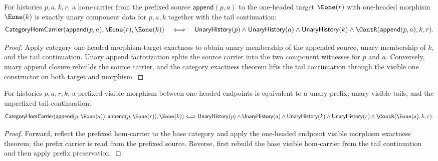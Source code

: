 \begin{theorem}
\label{thm:functor-prefix-hom-carrier-e1-morphism-target-components-iff}
For histories $p,a,k,r$, a hom-carrier from the prefixed source
$\mathsf{append}(p,a)$ to the one-headed target $\Eone(r)$ with one-headed
morphism $\Eone(k)$ is exactly unary component data for $p,a,k$ together with
the tail continuation:
$$
\mathsf{CategoryHomCarrier}(\mathsf{append}(p,a),\Eone(r),\Eone(k))
\quad\Longleftrightarrow\quad
\mathsf{UnaryHistory}(p)\land\mathsf{UnaryHistory}(a)\land
\mathsf{UnaryHistory}(k)\land\ContR(\mathsf{append}(p,a),k,r).
$$
\end{theorem}
\begin{proof}
Apply category one-headed morphism-target exactness to obtain unary membership
of the appended source, unary membership of $k$, and the tail continuation.
Unary append factorization splits the source carrier into the two component
witnesses for $p$ and $a$. Conversely, unary append closure rebuilds the source
carrier, and the category exactness theorem lifts the tail continuation through
the visible one constructor on both target and morphism.
\end{proof}
\begin{theorem}
\label{thm:functor-prefix-hom-carrier-e1-endpoint-visible-morphism-iff}
For histories $p,a,r,k$, a prefixed visible morphism between one-headed
endpoints is equivalent to a unary prefix, unary visible tails, and the
unprefixed tail continuation:
$$
\mathsf{CategoryHomCarrier}(\mathsf{append}(p,\Eone(a)),
\mathsf{append}(p,\Eone(r)),\Eone(k))
\Longleftrightarrow
\mathsf{UnaryHistory}(p)\wedge\mathsf{UnaryHistory}(a)\wedge
\mathsf{UnaryHistory}(k)\wedge\mathsf{UnaryHistory}(r)\wedge
\ContR(\Eone(a),k,r).
$$
\end{theorem}
\begin{proof}
Forward, reflect the prefixed hom-carrier to the base category and apply the
one-headed endpoint visible morphism exactness theorem; the prefix carrier is
read from the prefixed source. Reverse, first rebuild the base visible
hom-carrier from the tail continuation and then apply prefix preservation.
\end{proof}


